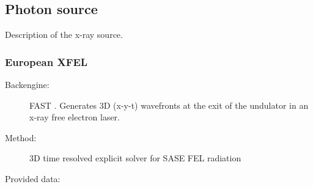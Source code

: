 \documentclass[12pt]{scrartcl}
\begin{document}
\subsection{Photon source}
Description of the x-ray source.
\subsubsection{European XFEL}
\begin{description}
  \item[Backengine:] FAST \cite{Saldin1999}. Generates 3D (x-y-t) wavefronts at the exit of the undulator in an x-ray free electron laser.
  \item[Method:] 3D time resolved explicit solver for SASE FEL radiation
  \item[Provided data:]\ \\
\end{description}
\end{document}

